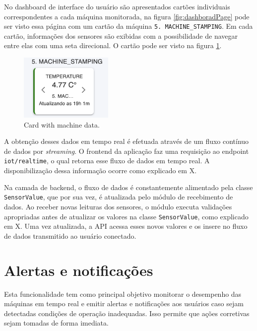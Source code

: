 No dashboard de interface do usuário são apresentados cartões individuais correspondentes a cada máquina monitorada, na figura \ref{fig:dashboradPage} pode ser visto essa página com um cartão da máquina \texttt{5. MACHINE\_STAMPING}. Em cada cartão, informações dos sensores são exibidas com a possibilidade de navegar entre elas com uma seta direcional. O cartão pode ser visto na figura \ref{fig:cardData}.

\begin{figure}[htbp]
	\centering
	\includegraphics[width=0.4\textwidth]{images/machineCard.png}
	\caption{Card with machine data.}
	\label{fig:cardData}
\end{figure}

A obtenção desses dados em tempo real é efetuada através de um fluxo contínuo de dados por \textit{streaming}. O frontend da aplicação faz uma requisição ao endpoint \texttt{iot/realtime}, o qual retorna esse fluxo de dados em tempo real. A disponibilização dessa informação ocorre como explicado em X. 

Na camada de backend, o fluxo de dados é constantemente alimentado pela classe \texttt{SensorValue}, que por sua vez, é atualizada pelo módulo de recebimento de dados. Ao receber novas leituras dos sensores, o módulo executa validações apropriadas antes de atualizar os valores na classe \texttt{SensorValue}, como explicado em X. Uma vez atualizada, a API acessa esses novos valores e os insere no fluxo de dados transmitido ao usuário conectado.


\section[Alertas e notificações]{Alertas e notificações}\label{sec:alertsAndNotifications}

Esta funcionalidade tem como principal objetivo monitorar o desempenho das máquinas em tempo real e emitir alertas e notificações aos usuários caso sejam detectadas condições de operação inadequadas. Isso permite que ações corretivas sejam tomadas de forma imediata.

